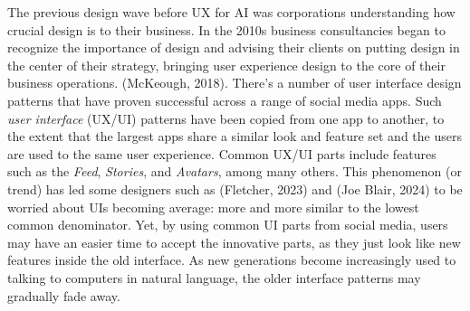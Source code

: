 \documentclass[
  12pt,
  letterpaper,
  DIV=11,
  numbers=noendperiod]{scrartcl}
\begin{document}
The previous design wave before UX for AI was corporations understanding
how crucial design is to their business. In the 2010s business
consultancies began to recognize the importance of design and advising
their clients on putting design in the center of their strategy,
bringing user experience design to the core of their business
operations. (McKeough, 2018). There's a number of user interface design
patterns that have proven successful across a range of social media
apps. Such \emph{user interface} (UX/UI) patterns have been copied from
one app to another, to the extent that the largest apps share a similar
look and feature set and the users are used to the same user experience.
Common UX/UI parts include features such as the \emph{Feed},
\emph{Stories}, and \emph{Avatars}, among many others. This phenomenon
(or trend) has led some designers such as (Fletcher, 2023) and (Joe
Blair, 2024) to be worried about UIs becoming average: more and more
similar to the lowest common denominator. Yet, by using common UI parts
from social media, users may have an easier time to accept the
innovative parts, as they just look like new features inside the old
interface. As new generations become increasingly used to talking to
computers in natural language, the older interface patterns may
gradually fade away.

\def\pandoctableshortcapt{Common Social Media UI Parts}
\end{document}
